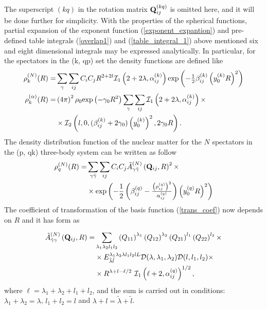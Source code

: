 \documentclass[
12pt, %
oneside, %
english, %
onehalfspacing, %
onehalfspacing, %
headsepline, %
]{MastersDoctoralThesis} %
\begin{document}
The superscript $(kq)$  in the rotation matrix $ {\bf Q}_{ij}^{(kq)}$ is omitted here, and it will be done further for simplicity.
With the properties of the spherical functions, partial expansion of the exponent function (\ref{exponent_expantion}) and pre-defined table integrals (\ref{overlap1}) and (\ref{table_integral_1})
above mentioned six and eight dimensional integrals  may be expressed analytically. In particular, for the spectators in the (k, qp) set the density functions are defined like
\begin{align}
\rho_k^{(N)}(R)=&
\sum_{\gamma }
\sum_{i j} C_{i} C_j R^{2+2l} 
\mathcal{I}_1 \left( 2+2\lambda,\alpha^{(k)}_{ij} \right)
{\rm exp}\left( - \tfrac{1}{2} \beta^{(k)}_{ij} \left( y^{(k)}_0 R \right)^2\right) \nonumber \\
\rho_{k}^{(\alpha)}(R)=&\left( 4 \pi \right)^2 \rho_0 {\rm exp}\left( - \gamma_0 R^2 \right)  
\sum_{\gamma }
\sum_{ij}  \mathcal{I}_1\left( 2+2\lambda, \alpha^{(k)}_{ij} \right) \times \nonumber \\
& \times
\mathcal{I}_2 \left( l, 0, (\beta^{(k)}_{ij}+2 \gamma_0) \left( y^{(k)}_0\right)^2, 2\gamma_0 R \right).
\label{kpq_density}
\end{align}
The density distribution function of the nuclear matter for the $N$ spectators in the (p, qk) three-body system can be written as follow
\begin{align}
\rho_q^{(N)}(R)= &
\sum_{\gamma \tilde{\gamma}}
\sum_{ij}
C_i C_j
\tilde{A}^{(N)}_{\gamma\tilde{\gamma}}\left( {\bf Q}_{ij}, R \right)^2
\times \nonumber \\
& \times
{\rm exp} \left( -\frac{1}{2} 
\left(  \beta^{(q)}_{ij} - \tfrac{\left(\rho^{(q)}_{ij}\right)^2}{\alpha^{(q)}_{ij}} \right) 
\left( y_0^{(q)} R\right)^2\right)
\label{pqk_density_N}
\end{align}
The coefficient of transformation of the basis function  (\ref{trans_coef}) now depends on $R$ and it has form as

 \begin{align}
\tilde{A}^{(N)}_{\tilde{\gamma}\gamma}\left( {\bf Q}_{ij}, R \right) = & \sum_{\lambda_1 \lambda_2 l_1 l_2} 
\left({ Q}_{11} \right)^{\lambda_1} 
\left({ Q}_{12} \right)^{\lambda_2} 
\left({ Q}_{21} \right)^{l_1} 
\left({ Q}_{22} \right)^{l_2} 
\times \nonumber
\\
& \times {E}^{\lambda_1 \lambda_2 \lambda l_1 l_2 l L}_{\tilde{\lambda} \tilde{l} } \mathcal{D}(\lambda,\lambda_1,\lambda_2) \mathcal{D}(l,l_1,l_2)
\times  \nonumber    \\
& \times R^{\lambda+l-\ell/2}~
\mathcal{I}_1\left( \ell +2
, \alpha^{(q)}_{ij} \right)^{1/2},
\end{align}
where $\ell=\lambda_1+\lambda_2+l_1+l_2$, and the sum is carried out in conditions: $\lambda_1+\lambda_2=\lambda$, $l_1+l_2=l$ and $\lambda+l=\tilde{\lambda}+\tilde{l}$.
\end{document}
